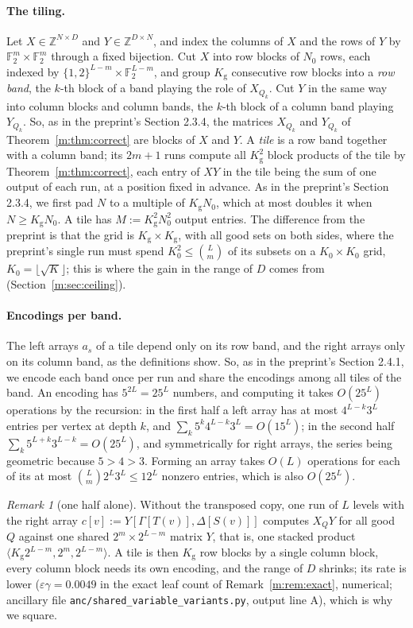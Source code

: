 \documentclass[11pt]{article}
\theoremstyle{definition}
\theoremstyle{remark}
\newtheorem{remark}[theorem]{Remark}
\newcommand{\Z}{\mathbb{Z}}
\newcommand{\F}{\mathbb{F}_2}
\newcommand{\Nz}{N_0}
\newcommand{\Kg}{K_{\mathrm g}}
\begin{document}
\paragraph{The tiling.} Let $X\in\Z^{N\times D}$ and $Y\in\Z^{D\times N}$, and index the columns of $X$ and the rows of $Y$ by $\F^m\times\F^m$ through a fixed bijection. Cut $X$ into row blocks of $\Nz$ rows, each indexed by $\{1,2\}^{L-m}\times\F^{L-m}$, and group $\Kg$ consecutive row blocks into a \emph{row band}, the $k$-th block of a band playing the role of $X_{Q_k}$. Cut $Y$ in the same way into column blocks and column bands, the $k$-th block of a column band playing $Y_{Q_k}$. So, as in the preprint's Section 2.3.4, the matrices $X_{Q_k}$ and $Y_{Q_k}$ of Theorem~\ref{m:thm:correct} are blocks of $X$ and $Y$. A \emph{tile} is a row band together with a column band; its $2m+1$ runs compute all $\Kg^2$ block products of the tile by Theorem~\ref{m:thm:correct}, each entry of $XY$ in the tile being the sum of one output of each run, at a position fixed in advance. As in the preprint's Section 2.3.4, we first pad $N$ to a multiple of $\Kg\Nz$, which at most doubles it when $N\ge\Kg\Nz$. A tile has $M:=\Kg^2\Nz^2$ output entries. The difference from the preprint is that the grid is $\Kg\times\Kg$, with all good sets on both sides, where the preprint's single run must spend $K_0^2\le\binom Lm$ of its subsets on a $K_0\times K_0$ grid, $K_0=\lfloor\sqrt K\rfloor$; this is where the gain in the range of $D$ comes from (Section~\ref{m:sec:ceiling}).

\paragraph{Encodings per band.} The left arrays $a_s$ of a tile depend only on its row band, and the right arrays only on its column band, as the definitions show. So, as in the preprint's Section 2.4.1, we encode each band once per run and share the encodings among all tiles of the band. An encoding has $5^{2L}=25^L$ numbers, and computing it takes $O(25^L)$ operations by the recursion: in the first half a left array has at most $4^{L-k}3^L$ entries per vertex at depth $k$, and $\sum_k5^k4^{L-k}3^L=O(15^L)$; in the second half $\sum_k5^{L+k}3^{L-k}=O(25^L)$, and symmetrically for right arrays, the series being geometric because $5>4>3$. Forming an array takes $O(L)$ operations for each of its at most $\binom Lm2^L3^L\le12^L$ nonzero entries, which is also $O(25^L)$.

\begin{remark}[one half alone]\label{m:rem:half}
Without the transposed copy, one run of $L$ levels with the right array $c[v]:=Y[\Gamma[T(v)],\Delta[S(v)]]$ computes $X_QY$ for all good $Q$ against one shared $2^m\times2^{L-m}$ matrix $Y$, that is, one stacked product $\langle\Kg2^{L-m},2^m,2^{L-m}\rangle$. A tile is then $\Kg$ row blocks by a single column block, every column block needs its own encoding, and the range of $D$ shrinks; its rate is lower ($\varepsilon\gamma=0.0049$ in the exact leaf count of Remark~\ref{m:rem:exact}, numerical; ancillary file \texttt{anc/shared\_variable\_variants.py}, output line A), which is why we square.
\end{remark}
\end{document}
